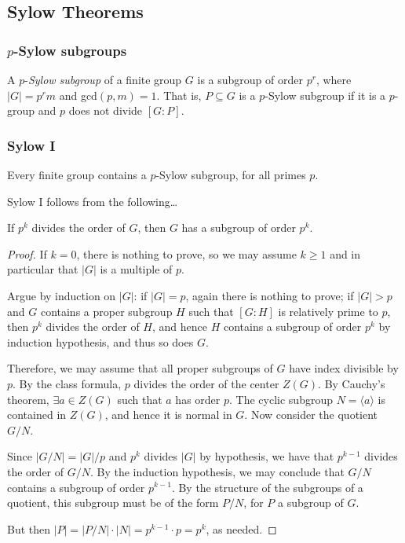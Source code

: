 \subsection{Sylow Theorems}\label{sylowtheorems}

\subsubsection{$p$-Sylow subgroups}\label{sylowsubgroup}
A $p$-\emph{Sylow subgroup} of a finite group $G$ is a subgroup of order $p^r$, where $|G| = p^r m$
and gcd$(p,m) = 1$. That is, $P \subseteq G$ is a $p$-Sylow subgroup if it is a $p$-group and $p$ does
not divide $[G:P]$.

\subsubsection{Sylow I}\label{sylow1}

\begin{theorem}
\label{sylowthm1}
Every finite group contains a $p$-Sylow subgroup, for all primes $p$.
\end{theorem}

\noindent Sylow I follows from the following\dots

\begin{proposition}
If $p^k$ divides the order of $G$, then $G$ has a subgroup of order $p^k$.
\end{proposition}

\begin{proof}
If $k = 0$, there is nothing to prove, so we may assume $k \geq 1$ and in particular that $|G|$ is a multiple of $p$.

Argue by induction on $|G|$: if $|G| = p$, again there is nothing to prove; if $|G| > p$ and $G$ contains a proper subgroup $H$
such that $[G : H]$ is relatively prime to $p$, then $p^k$ divides the order of $H$, and hence $H$ contains a subgroup of order $p^k$
by induction hypothesis, and thus so does $G$.

Therefore, we may assume that all proper subgroups of $G$ have index divisible by $p$. By the class formula, $p$ divides the order 
of the center $Z(G)$. By Cauchy's theorem, $\exists a \in Z(G)$ such that $a$ has order $p$. The cyclic subgroup $N = \langle a \rangle$
is contained in $Z(G)$, and hence it is normal in $G$. Now consider the quotient $G/N$.

Since $|G/N| = |G|/p$ and $p^k$ divides $|G|$ by hypothesis, we have that $p^{k-1}$ divides the order of $G/N$. By the induction hypothesis,
we may conclude that $G/N$ contains a subgroup of order $p^{k-1}$. By the structure of the subgroups of a quotient, this subgroup must
be of the form $P/N$, for $P$ a subgroup of $G$.

But then $|P| = |P/N| \cdot |N| = p^{k-1} \cdot p = p^k$, as needed.
\end{proof}


